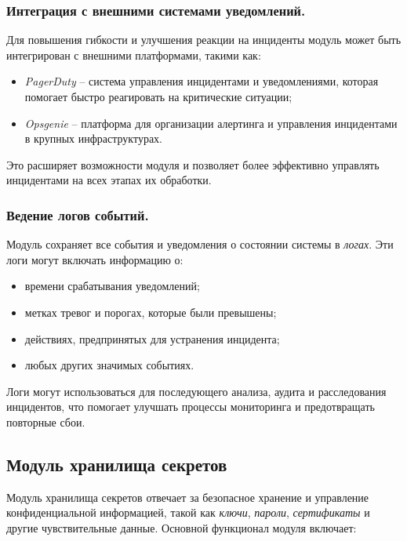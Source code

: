 \subsubsection{Интеграция с внешними системами уведомлений.} Для повышения гибкости и улучшения реакции на инциденты модуль может быть интегрирован с внешними платформами, такими как:
\begin{itemize}
    \item \textit{PagerDuty} -- система управления инцидентами и уведомлениями, которая помогает быстро реагировать на критические ситуации;
    \item \textit{Opsgenie} -- платформа для организации алертинга и управления инцидентами в крупных инфраструктурах.
\end{itemize}
Это расширяет возможности модуля и позволяет более эффективно управлять инцидентами на всех этапах их обработки.

\subsubsection{Ведение логов событий.} Модуль сохраняет все события и уведомления о состоянии системы в \textit{логах}. Эти логи могут включать информацию о:
\begin{itemize}
    \item времени срабатывания уведомлений;
    \item метках тревог и порогах, которые были превышены;
    \item действиях, предпринятых для устранения инцидента;
    \item любых других значимых событиях.
\end{itemize}
Логи могут использоваться для последующего анализа, аудита и расследования инцидентов, что помогает улучшать процессы мониторинга и предотвращать повторные сбои.


\subsection{Модуль хранилища секретов}
\label{sec:secrets_storage_functionality}

Модуль хранилища секретов отвечает за безопасное хранение и управление конфиденциальной информацией, такой как \textit{ключи}, \textit{пароли}, \textit{сертификаты} и другие чувствительные данные. Основной функционал модуля включает:

